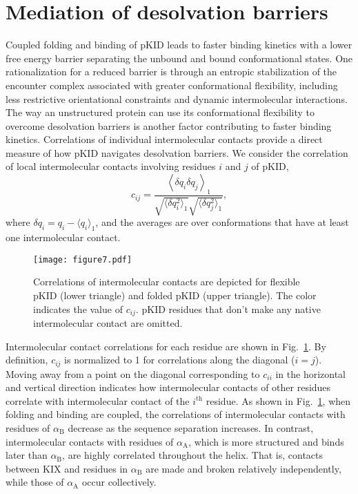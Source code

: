 \documentclass[../talant.diss.submit.tex]{subfiles}
\begin{document}
\section{\textbf{Mediation of desolvation barriers}}\label{sect:three_five}
%
Coupled folding and binding of pKID leads to faster binding kinetics with a
lower free energy barrier separating the unbound and bound conformational
states.  One rationalization for a reduced barrier is through an entropic
stabilization of the encounter complex associated with greater conformational
flexibility, including less restrictive orientational constraints and dynamic
intermolecular interactions.  The way an unstructured protein can use its
conformational flexibility to overcome desolvation barriers is another factor
contributing to faster binding kinetics.  Correlations of individual
intermolecular contacts provide a direct measure of how pKID navigates
desolvation barriers. We consider the correlation of local intermolecular
contacts involving residues $i$ and $j$ of pKID,
\begin{equation}
  c_{ij} = \frac{\left\langle \delta q_i\delta q_j\right\rangle_1}
  {\sqrt{\langle \delta q_{i}^{2}\rangle_1} \sqrt{\langle \delta{q}_j^2\rangle_1}},
  \label{eq:correlation}
\end{equation}
where  $\delta q_i = q_i - \langle q_i\rangle_1$,  and the averages are over
conformations that have at least one intermolecular contact.

\begin{figure}[ht!]
  \centering
  \texttt{[image: figure7.pdf]}
  \caption{Correlations of intermolecular contacts are depicted 
    for flexible pKID (lower triangle) and folded pKID (upper triangle).
    The color indicates the value of $c_{ij}$. pKID residues that don't make any native
    intermolecular contact are omitted.}
  \label{fig:figure7}
\end{figure}

Intermolecular contact correlations for each residue are shown in
Fig.~\ref{fig:figure7}.  By definition, $c_{ij}$ is normalized to 1 for
correlations along the diagonal ($i=j$). Moving away from a point on the
diagonal corresponding to $c_{ii}$ in the horizontal and vertical direction
indicates how intermolecular contacts of other residues correlate with
intermolecular contact of the $i^{\mathrm{th}}$ residue.  As shown in
Fig.~\ref{fig:figure7}, when folding and binding are coupled, the correlations
of intermolecular contacts with residues of $\alpha_\mathrm{B}$ decrease as the
sequence separation increases. In contrast, intermolecular contacts with
residues of $\alpha_\mathrm{A}$, which is more structured and binds later than
$\alpha_\mathrm{B}$, are highly correlated throughout the helix.  That is,
contacts between KIX and residues in $\alpha_\mathrm{B}$ are made and broken
relatively independently, while those of $\alpha_{\mathrm{A}}$ occur
collectively.
\end{document}
